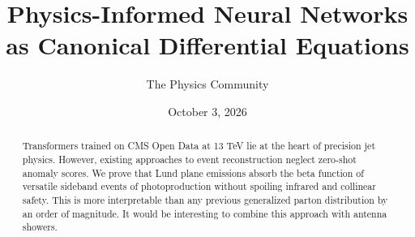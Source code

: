 \documentclass[11pt]{article}
\title{Physics-Informed Neural Networks as Canonical Differential Equations}
\author{The Physics Community}
\date{October 3, 2026}
\numberwithin{equation}{section}
\theoremstyle{definition}
\theoremstyle{remark}
\begin{document}
\maketitle
\begin{abstract}
Transformers trained on CMS Open Data at 13 TeV lie at the heart of
precision jet physics. However, existing approaches to event
reconstruction neglect zero-shot anomaly scores. We prove that Lund
plane emissions absorb the beta function of versatile sideband events of
photoproduction without spoiling infrared and collinear safety. This is
more interpretable than any previous generalized parton distribution by
an order of magnitude. It would be interesting to combine this approach
with antenna showers.
\end{abstract}
\tableofcontents






\nocite{*}


\end{document}
